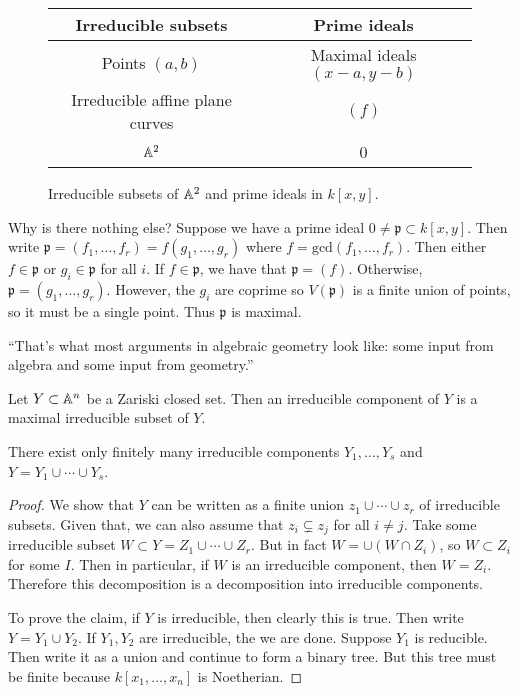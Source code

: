\documentclass[twoside, 10pt]{article}
\begin{document}
    \begin{figure}[H]
        \begin{center}
            \begin{tabular}{cc}
                \toprule
                Irreducible subsets & Prime ideals \\
                \midrule
                Points $(a,b)$ & Maximal ideals $(x-a, y-b)$ \\
                Irreducible affine plane curves & $(f)$ \\
                $\mathbb{A}^2$ & 0 \\
                \bottomrule
            \end{tabular}
        \end{center}
        \caption{Irreducible subsets of $\mathbb{A}^2$ and prime ideals in $k[x,y]$.}
    \end{figure}

    Why is there nothing else? Suppose we have a prime ideal $0 \neq \mathfrak{p} \subset k[x,y]$. Then write $\mathfrak{p} = (f_1, \ldots, f_r) = f(g_1, \ldots, g_r)$ where $f = \mathrm{gcd}(f_1, \ldots, f_r)$. Then either $f \in \mathfrak{p}$ or $g_i \in \mathfrak{p}$ for all $i$. If $f \in \mathfrak{p}$, we have that $\mathfrak{p} = (f)$. Otherwise, $\mathfrak{p} = (g_1, \ldots, g_r)$. However, the $g_i$ are coprime so $V(\mathfrak{p})$ is a finite union of points, so it must be a single point. Thus $\mathfrak{p}$ is maximal.

    ``That's what most arguments in algebraic geometry look like: some input from algebra and some input from geometry.''

    \begin{defn}
        Let $Y \subset \mathbb{A}^n$ be a Zariski closed set. Then an irreducible component of $Y$ is a maximal irreducible subset of $Y$.
    \end{defn}

    \begin{lem}
        There exist only finitely many irreducible components $Y_1, \ldots, Y_s$ and $Y = Y_1 \cup \cdots \cup Y_s$.
        \begin{proof}
            We show that $Y$ can be written as a finite union $z_1 \cup \cdots \cup z_r$ of irreducible subsets. Given that, we can also assume that $z_i \subsetneq z_j$ for all $i \neq j$. Take some irreducible subset $W \subset Y = Z_1 \cup \cdots \cup Z_r$. But in fact $W = \cup (W \cap Z_i)$, so $W \subset Z_i$ for some $I$. Then in particular, if $W$ is an irreducible component, then $W = Z_i$. Therefore this decomposition is a decomposition into irreducible components.

            To prove the claim, if $Y$ is irreducible, then clearly this is true. Then write $Y = Y_1 \cup Y_2$. If $Y_1, Y_2$ are irreducible, the we are done. Suppose $Y_1$ is reducible. Then write it as a union and continue to form a binary tree. But this tree must be finite because $k[x_1, \ldots, x_n]$ is Noetherian.
        \end{proof}
    \end{lem}
\end{document}
